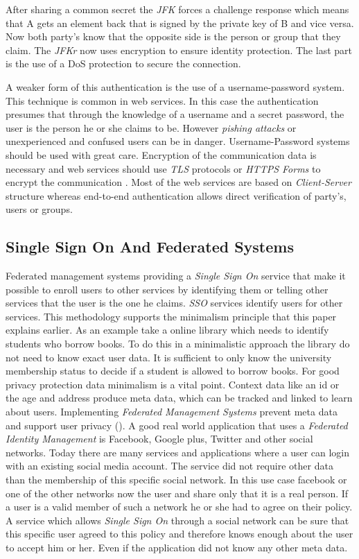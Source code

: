 After sharing a common secret the \textit{JFK} forces a challenge response which means that A gets an element back that is signed by the private key of B and vice versa. Now both party's know that the opposite side is the person or group that they claim. The \textit{JFKr} now uses encryption to ensure identity protection. The last part is the use of a DoS protection to secure the connection.

A weaker form of this authentication is the use of a username-password system. This technique is common in web services. In this case the authentication presumes that through the knowledge of a username and a secret password, the user is the person he or she claims to be. However \textit{pishing attacks} or unexperienced and confused users can be in danger. Username-Password systems should be used with great care. Encryption of the communication data is necessary and web services should use \textit{TLS} protocols or \textit{HTTPS Forms} to encrypt the communication \cite{bonneau2012quest}. Most of the web services are based on \textit{Client-Server} structure whereas end-to-end authentication allows direct verification of party's, users or groups.  

\subsection{Single Sign On And Federated Systems}
Federated management systems providing a \textit{Single Sign On} service that make it possible to enroll users to other services by identifying them or telling other services that the user is the one he claims. \textit{SSO} services identify users for other services. This methodology supports the minimalism principle that this paper explains earlier. As an example take a online library which needs to identify students who borrow books. To do this in a minimalistic approach the library do not need to know exact user data. It is sufficient to only know the university membership status to decide if a student is allowed to borrow books. For good privacy protection data minimalism is a vital point. Context data like an id or the age and address produce meta data, which can be tracked and linked to learn about users. Implementing \textit{Federated Management Systems} prevent meta data and support user privacy (\cite{alsaleh2006enhancing}). A good real world application that uses a \textit{Federated Identity Management} is Facebook, Google plus, Twitter and other social networks. Today there are many services and applications where a user can login with an existing social media account. The service did not require other data than the membership of this specific social network. In this use case facebook or one of the other networks now the user and share only that it is a real person. If a user is a valid member of such a network he or she had to agree on their policy. A service which allows \textit{Single Sign On} through a social network can be sure that this specific user agreed to this policy and therefore knows enough about the user to accept him or her. Even if the application did not know any other meta data. 

